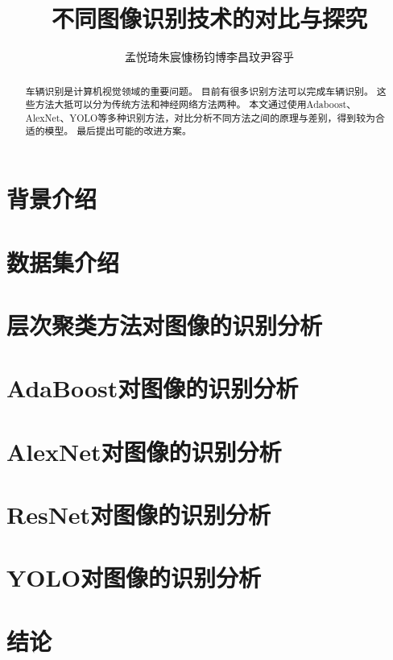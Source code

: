 \documentclass[UTF8]{ctexart}
\title{不同图像识别技术的对比与探究}
\author{孟悦琦\quad 朱宸慷\quad 杨钧博\quad 李昌玟\quad 尹容乎}
\begin{document}
\maketitle

\begin{abstract}
    车辆识别是计算机视觉领域的重要问题。
    目前有很多识别方法可以完成车辆识别。
    这些方法大抵可以分为传统方法和神经网络方法两种。
    本文通过使用Adaboost、AlexNet、YOLO等多种识别方法，对比分析不同方法之间的原理与差别，得到较为合适的模型。
    最后提出可能的改进方案。 \par
\end{abstract}

\section{背景介绍}


\section{数据集介绍}



\section{层次聚类方法对图像的识别分析}





\section{AdaBoost对图像的识别分析}


\section{AlexNet对图像的识别分析}


\section{ResNet对图像的识别分析}


\section{YOLO对图像的识别分析}


\section{结论}




\newpage
\small



\end{document}
